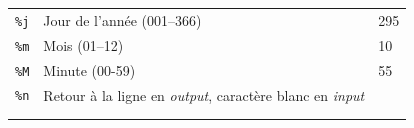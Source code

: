 \documentclass[
  11pt,
]{book}
\numberwithin{equation}{section}
\numberwithin{countremarque}{section}
\begin{document}
\begin{longtable}[]{@{}lll@{}}
\begin{minipage}[t]{0.20\columnwidth}\raggedright
\texttt{\%j}\strut
\end{minipage} & \begin{minipage}[t]{0.42\columnwidth}\raggedright
Jour de l'année (001--366)\strut
\end{minipage} & \begin{minipage}[t]{0.29\columnwidth}\raggedright
295\strut
\end{minipage}\tabularnewline
\begin{minipage}[t]{0.20\columnwidth}\raggedright
\texttt{\%m}\strut
\end{minipage} & \begin{minipage}[t]{0.42\columnwidth}\raggedright
Mois (01--12)\strut
\end{minipage} & \begin{minipage}[t]{0.29\columnwidth}\raggedright
10\strut
\end{minipage}\tabularnewline
\begin{minipage}[t]{0.20\columnwidth}\raggedright
\texttt{\%M}\strut
\end{minipage} & \begin{minipage}[t]{0.42\columnwidth}\raggedright
Minute (00-59)\strut
\end{minipage} & \begin{minipage}[t]{0.29\columnwidth}\raggedright
55\strut
\end{minipage}\tabularnewline
\begin{minipage}[t]{0.20\columnwidth}\raggedright
\texttt{\%n}\strut
\end{minipage} & \begin{minipage}[t]{0.42\columnwidth}\raggedright
Retour à la ligne en \emph{output}, caractère blanc en \emph{input}\strut
\end{minipage} & \begin{minipage}[t]{0.29\columnwidth}\raggedright
\strut
\end{minipage}\tabularnewline
\begin{minipage}[t]{0.20\columnwidth}\raggedright
\strut
\end{minipage} & \begin{minipage}[t]{0.42\columnwidth}\raggedright
\strut
\end{minipage} & \begin{minipage}[t]{0.29\columnwidth}\raggedright
\strut
\end{minipage}\tabularnewline
\begin{minipage}[t]{0.20\columnwidth}\raggedright

\end{minipage}
\end{longtable}
\end{document}
